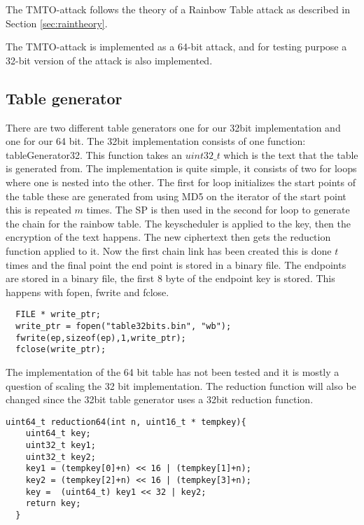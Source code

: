 The TMTO-attack follows the theory of a Rainbow Table attack as
described in Section \ref{sec:raintheory}.

The TMTO-attack is implemented as a 64-bit attack, and for testing
purpose a 32-bit version of the attack is also implemented.

\subsection{Table generator}

There are two different table generators one for our 32bit implementation and one for our 64 bit.
The 32bit implementation consists of one function: tableGenerator32. This function takes an $uint32\_t$ which is the text that the table is generated from. The implementation is quite simple, it consists of two for loops where one is nested into the other. The first for loop initializes the start points of the table these are generated from using MD5 on the iterator of the start point this is repeated $m$ times.
The SP is then used in the second for loop to generate the chain for the rainbow table.
The keyscheduler is applied to the key, then the encryption of the text happens. The new ciphertext then gets the reduction function applied to it. Now the first chain link has been created this is done $t$ times and the final point the end point is stored in a binary file.
The endpoints are stored in a binary file, the first 8 byte of the endpoint key is stored. This happens with fopen, fwrite and fclose.
\lstset{language=C}
\begin{lstlisting}
  FILE * write_ptr;
  write_ptr = fopen("table32bits.bin", "wb");
  fwrite(ep,sizeof(ep),1,write_ptr);
  fclose(write_ptr);
\end{lstlisting}
The implementation of the 64 bit table has not been tested and it is mostly a question of scaling the 32 bit implementation. The reduction function will also be changed since the 32bit table generator uses a 32bit reduction function.
\begin{lstlisting}
uint64_t reduction64(int n, uint16_t * tempkey){
    uint64_t key;
    uint32_t key1;
    uint32_t key2;
    key1 = (tempkey[0]+n) << 16 | (tempkey[1]+n);
    key2 = (tempkey[2]+n) << 16 | (tempkey[3]+n);
    key =  (uint64_t) key1 << 32 | key2;
    return key;
  }
\end{lstlisting}

